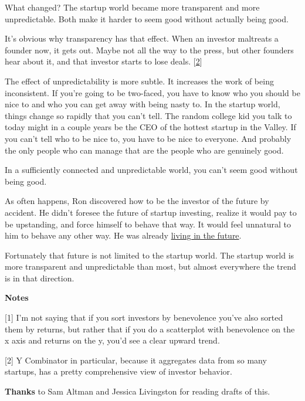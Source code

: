 What
                  changed? The startup world became more transparent and more
                  unpredictable. Both make it harder to seem good without
                  actually being good.

It's obvious why transparency
                  has that effect. When an investor maltreats a founder now, it
                  gets out. Maybe not all the way to the press, but other
                  founders hear about it, and that investor starts to lose
                  deals.
                  [\href{\#f2n}{2}]

The effect of unpredictability is more subtle. It
                  increases the work of being inconsistent. If you're going to
                  be two-faced, you have to know who you should be nice to and
                  who you can get away with being nasty to. In the startup
                  world, things change so rapidly that you can't tell. The
                  random college kid you talk to today might in a couple years
                  be the CEO of the hottest startup in the Valley. If you can't
                  tell who to be nice to, you have to be nice to everyone. And
                  probably the only people who can manage that are the people
                  who are genuinely good.

In a sufficiently connected
                  and unpredictable world, you can't seem good without being
                  good.

As often happens, Ron discovered how to be
                  the investor of the future by accident. He didn't foresee the
                  future of startup investing, realize it would pay to be
                  upstanding, and force himself to behave that way. It would
                  feel unnatural to him to behave any other way. He was already
                  \href{http://www.paulgraham.com/startupideas.html}{living in the future}.

Fortunately that future is not limited to the
                  startup world. The startup world is more transparent and
                  unpredictable than most, but almost everywhere the trend is in
                  that direction.









\textbf{Notes}

[1] I'm not saying that if you sort investors by benevolence
                  you've also sorted them by returns, but rather that if you do
                  a scatterplot with benevolence on the x axis and returns on
                  the y, you'd see a clear upward trend.

[2] Y Combinator in particular, because it aggregates data from
                  so many startups, has a pretty comprehensive view of investor
                  behavior.


                  \textbf{Thanks} to Sam Altman and Jessica Livingston for reading
                  drafts of this.


              
            
          
